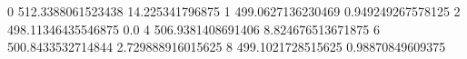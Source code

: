 0 512.3388061523438 14.225341796875
1 499.0627136230469 0.949249267578125
2 498.11346435546875 0.0
4 506.9381408691406 8.824676513671875
6 500.8433532714844 2.729888916015625
8 499.1021728515625 0.98870849609375
